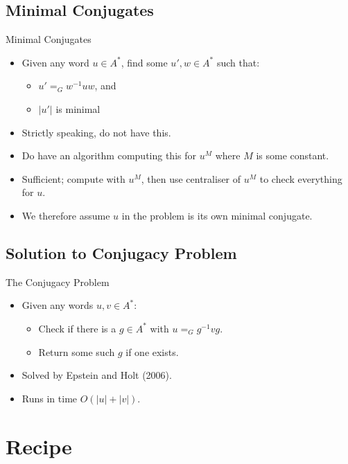 \documentclass{article}
\begin{document}
\subsection{Minimal Conjugates}

\begin{frame}{Minimal Conjugates}
  \begin{itemize}
    \item Given any word $u \in A^*$, find some $u', w \in A^*$ such that:
	\begin{itemize}
	  \item $u' =_G w^{-1}uw$, and
	  \item $|u'|$ is minimal
	\end{itemize}
	\pause
  	\item Strictly speaking, do not have this.
	\pause
	\item Do have an algorithm computing this for $u^M$ where $M$ is some constant.
	\item Sufficient; compute with $u^M$, then use centraliser of $u^M$ to check everything for $u$.
	\pause
	\item We therefore assume $u$ in the problem is its own minimal conjugate.
  \end{itemize}
\end{frame}

\subsection{Solution to Conjugacy Problem}

\begin{frame}{The Conjugacy Problem}
  \begin{itemize}
    \item Given any words $u, v \in A^*$:
	\begin{itemize}
	  \item Check if there is a $g \in A^*$ with $u =_G g^{-1}vg$.
	  \item Return some such $g$ if one exists. 
    \end{itemize}
	\pause
	\item Solved by Epstein and Holt (2006).
	\item Runs in time $O(|u| + |v|)$.
  \end{itemize}
\end{frame}

\section{Recipe}
\end{document}
